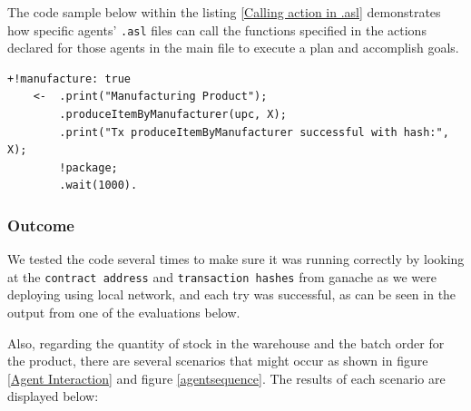 \vspace{.5cm}

The code sample below within the listing \ref{Calling action in .asl} demonstrates how specific agents' \texttt{.asl} files can call the functions specified in the actions declared for those agents in the main file to execute a plan and accomplish goals.

\vspace{.5cm}

\begin{lstlisting}[caption={Calling action in .asl},label={Calling action in .asl},frame=none, numbers=none]
    +!manufacture: true
    <-  .print("Manufacturing Product");
        .produceItemByManufacturer(upc, X);
        .print("Tx produceItemByManufacturer successful with hash:", X);
        !package;
        .wait(1000).
\end{lstlisting}

\vspace{.5cm}
\subsubsection{Outcome}

We tested the code several times to make sure it was running correctly by looking at the \texttt{contract address} and \texttt{transaction hashes} from ganache as we were deploying using local network, and each try was successful, as can be seen in the output from one of the evaluations below.

\vspace{.5cm}

Also, regarding the quantity of stock in the warehouse and the batch order for the product, there are several scenarios that might occur as shown in figure \ref{Agent Interaction} and figure \ref{agentsequence}. The results of each scenario are displayed below:

\vspace{.5cm}


